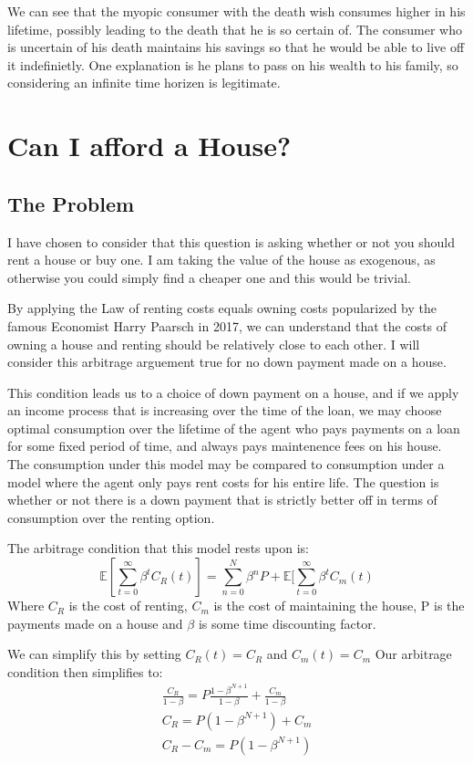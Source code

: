 \documentclass[10pt]{paper}
\begin{document}
We can see that the myopic consumer with the death wish consumes
higher in his lifetime, possibly leading to the death that he is so
certain of. The consumer who is uncertain of his death maintains his
savings so that he would be able to live off it indefinietly. One
explanation is he plans to pass on his wealth to his family, so
considering an infinite time horizen is legitimate. 

\section{Can I afford a House?}

\subsection*{The Problem}

I have chosen to consider that this question is asking whether or not
you should rent a house or buy one. I am taking the value of the house
as exogenous, as otherwise you could simply find a cheaper one and
this would be trivial.

By applying the Law of renting costs equals owning costs popularized
by the famous Economist Harry Paarsch in 2017, we can understand
that the costs of owning a house and renting should be relatively
close to each other. I will consider this arbitrage arguement true for
no down payment made on a house.

This condition leads us to a choice of down payment on a house, and if
we apply an income process that is increasing over the time of the
loan, we may choose optimal consumption over the lifetime of the agent
who pays payments on a loan for some fixed period of time, and always
pays maintenence fees on his house. The consumption under this model
may be compared to consumption under a model where the agent only pays
rent costs for his entire life. The question is whether or not there
is a down payment that is strictly better off in terms of consumption
over the renting option.

The arbitrage condition that this model rests upon is:
$$\mathbb{E}[\sum_{t=0}^\infty \beta^t C_R(t)] = \sum_{n=0}^N \beta^n P + \mathbb{E}[\sum_{t=0}^\infty
\beta^t C_m(t)$$
Where $C_R$ is the cost of renting, $C_m$ is the cost of maintaining
the house, P is the payments made on a house  and $\beta$ is some time
discounting factor.

We can simplify this by setting $C_R(t) = C_R$ and $C_m(t) = C_m$
Our arbitrage condition then simplifies to:
\begin{align*}
  \frac{C_R}{1-\beta} = P \frac{1-\beta^{N+1}}{1-\beta} + \frac{C_m}{1-\beta}\\
  C_R = P(1-\beta^{N+1}) + C_m\\
  C_R - C_m = P( 1- \beta^{N+1} )\\
\end{align*}
\end{document}
